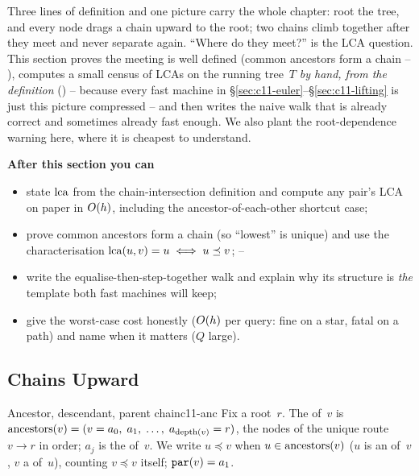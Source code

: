 \begin{topicintro}
Three lines of definition and one picture carry the whole chapter: root
the tree, and every node drags a chain upward to the root; two chains
climb together after they meet and never separate again.  ``Where do they
meet?'' is the LCA question.  This section proves the meeting is well
defined (common ancestors form a chain -- ), computes a
small census of LCAs on the running tree~\(T\) \emph{by hand, from the
definition} () -- because every fast machine in
\S\ref{sec:c11-euler}--\S\ref{sec:c11-lifting} is just this picture
compressed -- and then writes the naive walk that is already correct and
sometimes already fast enough.  We also plant the root-dependence warning
here, where it is cheapest to understand.

\textbf{After this section you can}
\begin{itemize}[nosep]
  \item state \(\operatorname{lca}\) from the chain-intersection definition and compute
        any pair's LCA on paper in \(O(h)\), including the
        ancestor-of-each-other shortcut case; \hfill{}
  \item prove common ancestors form a chain (so ``lowest'' is unique) and
        use the characterisation \(\operatorname{lca}(u,v) = u \iff u \preceq v\);
        \hfill{}--
  \item write the equalise-then-step-together walk and explain why its
        structure is \emph{the} template both fast machines will keep;
        \hfill{}
  \item give the worst-case cost honestly (\(O(h)\) per query: fine on
        a star, fatal on a path) and name when it matters (\(Q\) large).
        \hfill{}
\end{itemize}
\end{topicintro}

\subsection{Chains Upward}

\begin{definition}{Ancestor, descendant, parent chain}{c11-anc}
Fix a root~\(r\).  The  of~\(v\) is
\(\operatorname{ancestors}(v) = (v = a_0,\; a_1,\; \dots,\; a_{\operatorname{depth}(v)} = r)\), the
nodes of the unique route \(v \to r\) in order; \(a_j\) is the
 of~\(v\).  We write \(u \preceq v\) when
\(u \in \operatorname{ancestors}(v)\) (\(u\) is an  of~\(v\), \(v\) a
 of~\(u\)), counting \(v \preceq v\) itself;
\(\texttt{par}(v) = a_1\).
\end{definition}

